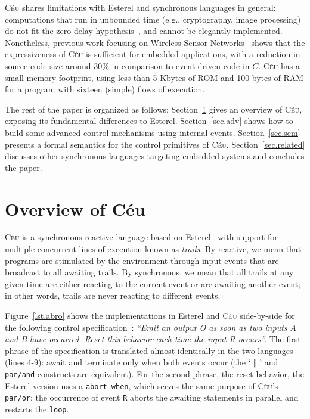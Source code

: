 \documentclass{acm_proc_article-sp}
\newcommand{\CEU}{\textsc{C\'{e}u}\xspace}
\newcommand{\code}[1] {{\small{\texttt{#1}}}}
\newcommand{\1}{\;}
\newcommand{\2}{\;\;}
\newcommand{\3}{\;\;\;}
\newcommand{\5}{\;\;\;\;\;}
\begin{document}

\CEU shares limitations with Esterel and synchronous languages in general:
computations that run in unbounded time (e.g., cryptography, image processing) 
do not fit the zero-delay hypothesis~\cite{rp.hypothesis}, and cannot be 
elegantly implemented.
%
Nonetheless, previous work focusing on Wireless Sensor 
Networks~\cite{ceu.sensys13} shows that the expressiveness of \CEU is 
sufficient for embedded applications, with a reduction in source code size 
around 30\% in comparison to event-driven code in $C$.
%
\CEU has a small memory footprint, using less than 5 Kbytes of ROM and 100 
bytes of RAM for a program with sixteen (simple) flows of execution.

The rest of the paper is organized as follows:
Section~\ref{sec.ceu} gives an overview of \CEU, exposing its fundamental 
differences to Esterel.
Section~\ref{sec.adv} shows how to build some advanced control mechanisms using 
internal events.
Section~\ref{sec.sem} presents a formal semantics for the control primitives of 
\CEU.
Section~\ref{sec.related} discusses other synchronous languages targeting 
embedded systems and concludes the paper.

\section{Overview of C\'eu}
\label{sec.ceu}

\CEU is a synchronous reactive language based on Esterel~\cite{esterel.ieee91} 
with support for multiple concurrent lines of execution known as \emph{trails}.
By reactive, we mean that programs are stimulated by the environment through 
input events that are broadcast to all awaiting trails.
By synchronous, we mean that all trails at any given time are either reacting 
to the current event or are awaiting another event;
in other words, trails are never reacting to different events.

Figure~\ref{lst.abro} shows the implementations in Esterel and \CEU 
side-by-side for the following control specification~\cite{esterel.primer}:
%
\emph{``Emit an output O as soon as two inputs A and B have occurred.
Reset this behavior each time the input R occurs''.}
%
The first phrase of the specification is translated almost identically in the 
two languages (lines 4-9): await and terminate only when both events occur
(the `$\|$' and \code{par/and} constructs are equivalent).
%
For the second phrase, the reset behavior, the Esterel version uses a 
\code{abort-when}, which serves the same purpose of \CEU's \code{par/or}:
the occurrence of event \code{R} aborts the awaiting statements in parallel and 
restarts the \code{loop}.
\end{document}
